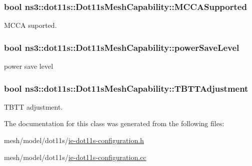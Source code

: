 \subsubsection[{\texorpdfstring{M\+C\+C\+A\+Supported}{MCCASupported}}]{\setlength{\rightskip}{0pt plus 5cm}bool ns3\+::dot11s\+::\+Dot11s\+Mesh\+Capability\+::\+M\+C\+C\+A\+Supported}\hypertarget{classns3_1_1dot11s_1_1Dot11sMeshCapability_af564c2e49d1af39003b9260e2188e157}{}\label{classns3_1_1dot11s_1_1Dot11sMeshCapability_af564c2e49d1af39003b9260e2188e157}


M\+C\+CA suported. 

\subsubsection[{\texorpdfstring{power\+Save\+Level}{powerSaveLevel}}]{\setlength{\rightskip}{0pt plus 5cm}bool ns3\+::dot11s\+::\+Dot11s\+Mesh\+Capability\+::power\+Save\+Level}\hypertarget{classns3_1_1dot11s_1_1Dot11sMeshCapability_aa25d9a3781b4fa1d83808d4b28598d8e}{}\label{classns3_1_1dot11s_1_1Dot11sMeshCapability_aa25d9a3781b4fa1d83808d4b28598d8e}


power save level 

\subsubsection[{\texorpdfstring{T\+B\+T\+T\+Adjustment}{TBTTAdjustment}}]{\setlength{\rightskip}{0pt plus 5cm}bool ns3\+::dot11s\+::\+Dot11s\+Mesh\+Capability\+::\+T\+B\+T\+T\+Adjustment}\hypertarget{classns3_1_1dot11s_1_1Dot11sMeshCapability_adecf19126b3a6de0be14f65b814aa6ef}{}\label{classns3_1_1dot11s_1_1Dot11sMeshCapability_adecf19126b3a6de0be14f65b814aa6ef}


T\+B\+TT adjustment. 



The documentation for this class was generated from the following files\+:\begin{DoxyCompactItemize}
\item 
mesh/model/dot11s/\hyperlink{ie-dot11s-configuration_8h}{ie-\/dot11s-\/configuration.\+h}\item 
mesh/model/dot11s/\hyperlink{ie-dot11s-configuration_8cc}{ie-\/dot11s-\/configuration.\+cc}\end{DoxyCompactItemize}
